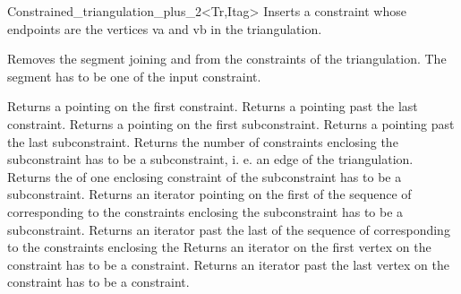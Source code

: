 \begin{ccRefClass}{Constrained_triangulation_plus_2<Tr,Itag>}
{ Inserts a constraint whose endpoints are the vertices va and vb
in the triangulation. }

{Removes the segment joining  and 
from the constraints of the triangulation. 
\ccPrecond The segment  has to be one of the input
constraint.}


{Returns a  pointing on the first
constraint.}
\ccGlue
{}
{Returns a  pointing past the last
constraint.}
\ccGlue
{}
{Returns a  pointing on the first
subconstraint.}
\ccGlue
{}
{Returns a  pointing past the last
subconstraint.}
\ccGlue
{}
{Returns the number of constraints enclosing the subconstraint
\ccPrecond {} has to be a subconstraint, i. e. an edge
of the triangulation.}
\ccGlue
{}
{Returns the   of one enclosing constraint of the
subconstraint  
\ccPrecond {} has to be a subconstraint.}
\ccGlue
{}
{Returns an iterator pointing on the first 
of the sequence of 
corresponding to the constraints enclosing the subconstraint
\ccPrecond {} has to be a subconstraint.}
\ccGlue
{}
{Returns an iterator past the last  
of the sequence of 
corresponding to the constraints enclosing the  }
\ccGlue
{}
{Returns an iterator on the first vertex on the constraint
\ccPrecond {} has to be a constraint.}
\ccGlue
{}
{Returns an iterator past  the last  vertex on  the constraint
\ccPrecond {} has to be a constraint.}



\end{ccRefClass}
